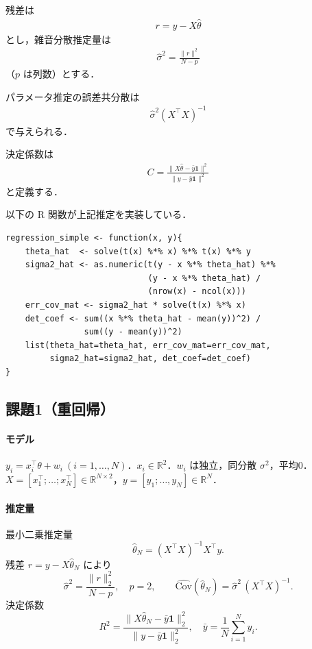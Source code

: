 残差は
\begin{align}
 r = y - X\hat{\theta}
\end{align}
とし，雑音分散推定量は
\begin{align}
 \hat{\sigma}^2 = \frac{\lVert r \rVert^2}{N - p}
\end{align}
（$p$ は列数）とする．

パラメータ推定の誤差共分散は
\begin{align}
 \hat{\sigma}^2 (X^\top X)^{-1}
\end{align}
で与えられる．

決定係数は
\begin{align}
 C = \frac{\lVert X\hat{\theta} - \bar{y}\mathbf{1} \rVert^2}
          {\lVert y - \bar{y}\mathbf{1} \rVert^2}
\end{align}
と定義する．

以下の R 関数が上記推定を実装している．

\begin{verbatim}
regression_simple <- function(x, y){
    theta_hat  <- solve(t(x) %*% x) %*% t(x) %*% y
    sigma2_hat <- as.numeric(t(y - x %*% theta_hat) %*%
                             (y - x %*% theta_hat) /
                             (nrow(x) - ncol(x)))
    err_cov_mat <- sigma2_hat * solve(t(x) %*% x)
    det_coef <- sum((x %*% theta_hat - mean(y))^2) /
                sum((y - mean(y))^2)
    list(theta_hat=theta_hat, err_cov_mat=err_cov_mat,
         sigma2_hat=sigma2_hat, det_coef=det_coef)
}
\end{verbatim}


\subsection{課題1（重回帰）}

\paragraph{モデル}
$y_i = x_i^\top \theta + w_i \ (i=1,\dots,N)$．$x_i\in\mathbb{R}^2$．$w_i$ は独立，同分散 $\sigma^2$，平均0．
$X=[x_1^\top;\dots;x_N^\top]\in\mathbb{R}^{N\times2}$，$y=[y_1;\dots,y_N]\in\mathbb{R}^N$．

\paragraph{推定量}
最小二乗推定量
\[
\hat\theta_N=(X^\top X)^{-1}X^\top y .
\]
残差 $r=y-X\hat\theta_N$ により
\[
\hat\sigma^2=\frac{\|r\|_2^2}{N-p},\quad p=2, \qquad
\widehat{\mathrm{Cov}}(\hat\theta_N)=\hat\sigma^2\,(X^\top X)^{-1}.
\]
決定係数
\[
R^2=\frac{\|X\hat\theta_N-\bar y\mathbf{1}\|_2^2}{\|y-\bar y\mathbf{1}\|_2^2},\quad
\bar y=\frac1N\sum_{i=1}^N y_i .
\]

